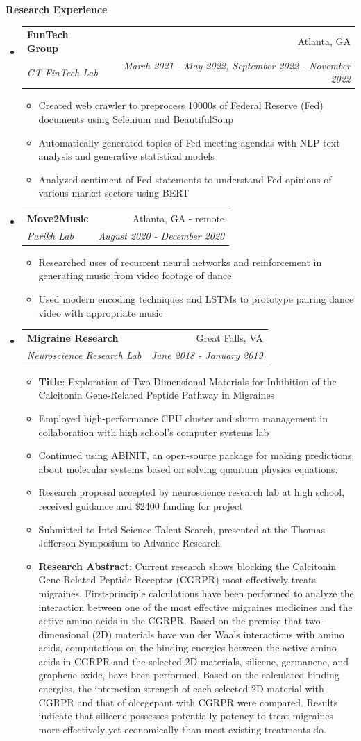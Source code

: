 \documentclass[letterpaper,11pt]{article}
\makeatletter
\newcommand{\resitem}[1]{\item #1 \vspace{-2pt}}
\newcommand{\resheading}[1]{{\large \colorbox{mygrey}{\begin{minipage}{\textwidth}{\textbf{#1 \vphantom{p\^{E}}}}\end{minipage}}}}
\newcommand{\ressubheading}[4]{
\begin{tabular*}{7.0in}{l@{\extracolsep{\fill}}r}
		\textbf{#1} & #2 \\
		\textit{#3} & \textit{#4} \\
\end{tabular*}\vspace{-6pt}}
\makeatother
\begin{document}

\resheading{Research Experience}
\begin{itemize}
\item
    \ressubheading{FunTech Group}{Atlanta, GA}{GT FinTech Lab}{March 2021 - May 2022, September 2022 - November 2022}
    \begin{itemize}
        \resitem{Created web crawler to preprocess 10000s of Federal Reserve (Fed) documents using Selenium and BeautifulSoup}
        \resitem{Automatically generated topics of Fed meeting agendas with NLP text analysis and generative statistical models}  %
        \resitem{Analyzed sentiment of Fed statements to understand Fed opinions of various market sectors using BERT}
    \end{itemize}
\item
    \ressubheading{Move2Music}{Atlanta, GA - remote}{Parikh Lab}{August 2020 - December 2020}
    \begin{itemize}
        \resitem{Researched uses of recurrent neural networks and reinforcement in generating music from video footage of dance}
        \resitem{Used modern encoding techniques and LSTMs to prototype pairing dance video with appropriate music}
    \end{itemize}
\item
	\ressubheading{Migraine Research}{Great Falls, VA}{Neuroscience Research Lab}{June 2018 - January 2019}
	\begin{itemize}
		\resitem{\textbf{Title}: Exploration of Two-Dimensional Materials for Inhibition of the Calcitonin Gene-Related Peptide Pathway in Migraines}
	    \resitem{Employed high-performance CPU cluster and slurm management in collaboration with high school's computer systems lab}
	    \resitem{Continued using ABINIT, an open-source package for making predictions about molecular systems based on solving quantum physics equations.}
	    \resitem{Research proposal accepted by neuroscience research lab at high school, received guidance and \$2400 funding for project}
	    \resitem{Submitted to Intel Science Talent Search, presented at the Thomas Jefferson Symposium to Advance Research}
		\resitem{\textbf{Research Abstract}: \footnotesize{Current research shows blocking the Calcitonin Gene-Related Peptide Receptor (CGRPR) most effectively treats migraines. First-principle calculations have been performed to analyze the interaction between one of the most effective migraines medicines and the active amino acids in the CGRPR. Based on the premise that two-dimensional (2D) materials have van der Waals interactions with amino acids, computations on the binding energies between the active amino acids in CGRPR and the selected 2D materials, silicene, germanene, and graphene oxide, have been performed. Based on the calculated binding energies, the interaction strength of each selected 2D material with CGRPR and that of olcegepant with CGRPR were compared. Results indicate that silicene possesses potentially potency to treat migraines more effectively yet economically than most existing treatments do.}}

\end{itemize}
\end{itemize}
\end{document}
